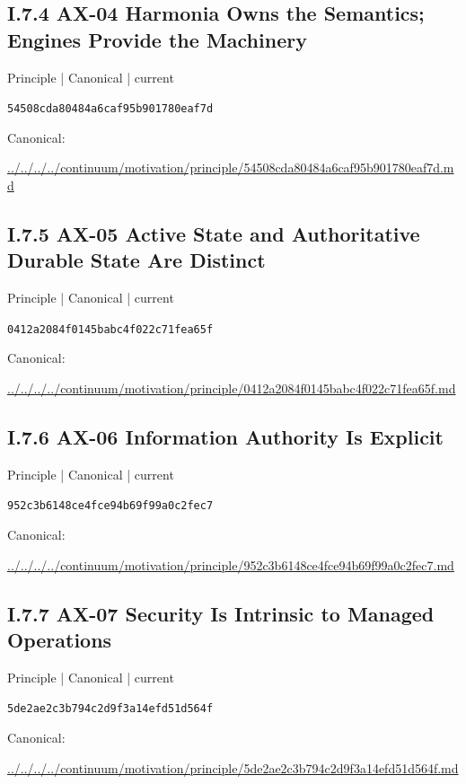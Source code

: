 \documentclass[10pt,a4paper]{article}
\begin{document}
\subsection*{I.7.4 AX-04 Harmonia Owns the Semantics; Engines Provide the Machinery}
{\small Principle | Canonical | current}\par
\texttt{54508cda80484a6caf95b901780eaf7d}\par
Canonical: \par
{\footnotesize\url{../../../../continuum/motivation/principle/54508cda80484a6caf95b901780eaf7d.md}}\par
\subsection*{I.7.5 AX-05 Active State and Authoritative Durable State Are Distinct}
{\small Principle | Canonical | current}\par
\texttt{0412a2084f0145babc4f022c71fea65f}\par
Canonical: \par
{\footnotesize\url{../../../../continuum/motivation/principle/0412a2084f0145babc4f022c71fea65f.md}}\par
\subsection*{I.7.6 AX-06 Information Authority Is Explicit}
{\small Principle | Canonical | current}\par
\texttt{952c3b6148ce4fce94b69f99a0c2fec7}\par
Canonical: \par
{\footnotesize\url{../../../../continuum/motivation/principle/952c3b6148ce4fce94b69f99a0c2fec7.md}}\par
\subsection*{I.7.7 AX-07 Security Is Intrinsic to Managed Operations}
{\small Principle | Canonical | current}\par
\texttt{5de2ae2c3b794c2d9f3a14efd51d564f}\par
Canonical: \par
{\footnotesize\url{../../../../continuum/motivation/principle/5de2ae2c3b794c2d9f3a14efd51d564f.md}}\par
\end{document}

